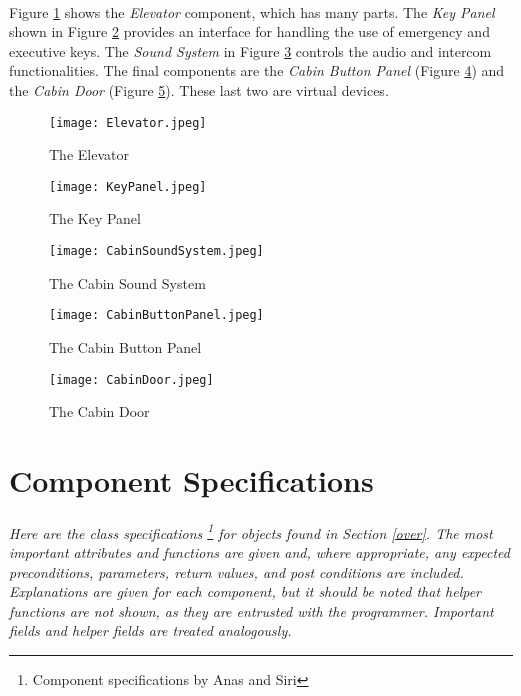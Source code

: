 \documentclass[12pt]{article}
\begin{document}
		\paragraph{} Figure \ref{fig:elevator} shows the \textit{Elevator} component, which has many parts. The \textit{Key Panel} shown 
		in Figure \ref{fig:keypanel} provides an interface for handling the use of emergency and executive keys. The \textit{Sound System} 
		in Figure \ref{fig:soundsystem} controls the audio and intercom functionalities. The final components are the \textit{Cabin Button Panel} 
		(Figure \ref{fig:cabinbuttonpanel}) and the \textit{Cabin Door} (Figure \ref{fig:cabindoor}). These last two are virtual devices.
		\begin{figure}[H]
			\centerline{\texttt{[image: Elevator.jpeg]}}
			\caption{The Elevator}
			\label{fig:elevator}
		\end{figure}
			\begin{figure}[H]
				\centerline{\texttt{[image: KeyPanel.jpeg]}}
				\caption{The Key Panel}
				\label{fig:keypanel}
			\end{figure}	
			\begin{figure}[H]
				\centerline{\texttt{[image: CabinSoundSystem.jpeg]}}
				\caption{The Cabin Sound System}
				\label{fig:soundsystem}
			\end{figure}
			\begin{figure}[H]
				\centerline{\texttt{[image: CabinButtonPanel.jpeg]}}
				\caption{The Cabin Button Panel}
				\label{fig:cabinbuttonpanel}
			\end{figure}
			\begin{figure}[H]
				\centerline{\texttt{[image: CabinDoor.jpeg]}}
				\caption{The Cabin Door}
				\label{fig:cabindoor}
			\end{figure}


\section{Component Specifications}
\paragraph{} \textit{Here are the class specifications \footnote{Component specifications by Anas and Siri} for objects 
found in Section \ref{over}. The most important attributes and functions are given and, where appropriate, any expected 
preconditions, parameters, return values, and post conditions are included. Explanations are given for each component, but 
it should be noted that helper functions are not shown, as they are entrusted with the programmer. Important fields and helper
fields are treated analogously.}
\end{document}

